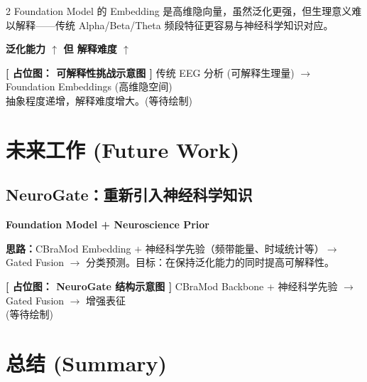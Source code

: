\documentclass[12pt, a0paper]{article}
\renewcommand{\large}{\fontsize{26}{34}\selectfont}
\renewcommand{\Large}{\fontsize{30}{38}\selectfont}
\renewcommand{\small}{\fontsize{16}{22}\selectfont}
\newcommand{\placeholderh}[3]{%
    \begin{center}
    \colorbox{mygray!12}{\parbox{0.9\columnwidth}{%
        \centering
        \vspace{1.2em}
        {\Large\bfseries\color{mygray} [ 占位图： #1 ]}
        \vspace{0.8em}
        {\small\color{mygray} #2}
        \vspace{#3}
    }}
    \end{center}
}
\begin{document}
\begin{multicols}{2}
Foundation Model 的 Embedding 是高维隐向量，虽然泛化更强，但生理意义难以解释——传统 Alpha/Beta/Theta 频段特征更容易与神经科学知识对应。

\begin{center}
\colorbox{myorange!10}{\parbox{0.9\columnwidth}{\centering\bfseries
    泛化能力 $\uparrow$ \hspace{2em} 但 \hspace{2em} 解释难度 $\uparrow$
}}
\end{center}

\placeholderh{可解释性挑战示意图}{%
    传统 EEG 分析 (可解释生理量) $\rightarrow$ Foundation Embeddings (高维隐空间)\\
    抽象程度递增，解释难度增大。\quad (等待绘制)}{4cm}

\section{未来工作 (Future Work)}

\subsection{NeuroGate：重新引入神经科学知识}

\begin{center}
\large\bfseries
Foundation Model \quad + \quad Neuroscience Prior
\end{center}

\textbf{思路：}CBraMod Embedding $+$ 神经科学先验（频带能量、时域统计等）$\rightarrow$ Gated Fusion $\rightarrow$ 分类预测。目标：在保持泛化能力的同时提高可解释性。

\placeholderh{NeuroGate 结构示意图}{%
    CBraMod Backbone + 神经科学先验 $\rightarrow$ Gated Fusion $\rightarrow$ 增强表征\\
    \small (等待绘制)}{4.5cm}

\section{总结 (Summary)}


\end{multicols}
\end{document}
